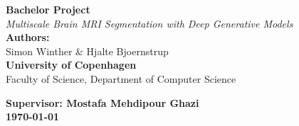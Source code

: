 \documentclass[12pt]{article}
\begin{document}
\begin{titlepage}

  \begin{center}
      \vspace*{7cm}
      {\Huge \textbf{Bachelor Project}} \\[0.8cm]
      {\Large \textit{Multiscale Brain MRI Segmentation with Deep Generative Models}} \\[2cm]
      {\Large \textbf{Authors:}} \\
      Simon Winther \& Hjalte Bjoernstrup \\[1.5cm]
      {\Large \textbf{University of Copenhagen}} \\[0.5cm]
      {\Large Faculty of Science, Department of Computer Science} \\[1.5cm]
  \end{center}
  \vspace*{3.5cm}
  {\textbf{\small Supervisor: Mostafa Mehdipour Ghazi}} \\
  {\textbf{\small \today}}
  \vfill
\end{titlepage}



\tableofcontents
\clearpage







\end{document}
